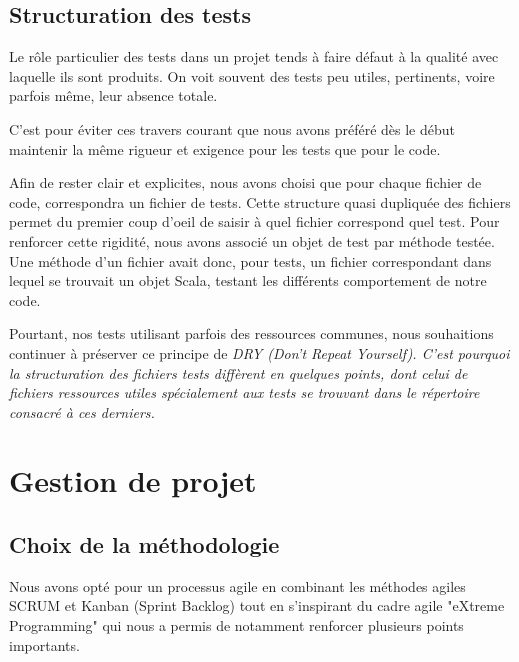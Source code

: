 \documentclass[a4paper, 12pt]{report}
\newcommand{\en}[1]{\it{#1}}
\begin{document}
    
    \chapter{Structuration des tests}
    
    Le rôle particulier des tests dans un projet tends à faire défaut à la qualité avec laquelle ils sont produits. On voit souvent des tests peu utiles, pertinents, voire parfois même, leur absence totale.
    
    C'est pour éviter ces travers courant que nous avons préféré dès le début maintenir la même rigueur et exigence pour les tests que pour le code.
    
    Afin de rester clair et explicites, nous avons choisi que pour chaque fichier de code, correspondra un fichier de tests. Cette structure quasi dupliquée des fichiers permet du premier coup d'oeil de saisir à quel fichier correspond quel test. Pour renforcer cette rigidité, nous avons associé un objet de test par méthode testée. Une méthode d'un fichier avait donc, pour tests, un fichier correspondant dans lequel se trouvait un objet Scala, testant les différents comportement de notre code.
    
    Pourtant, nos tests utilisant parfois des ressources communes, nous souhaitions continuer à préserver ce principe de \en{DRY} (Don't Repeat Yourself). C'est pourquoi la structuration des fichiers tests diffèrent en quelques points, dont celui de fichiers ressources utiles spécialement aux tests se trouvant dans le répertoire consacré à ces derniers.


\part{Gestion de projet}

    \chapter{Choix de la méthodologie} %
    Nous avons opté pour un processus agile en combinant les méthodes agiles SCRUM et Kanban (Sprint Backlog) tout en s'inspirant du cadre agile "eXtreme Programming" qui nous a permis de notamment renforcer plusieurs points importants.
    
\end{document}
